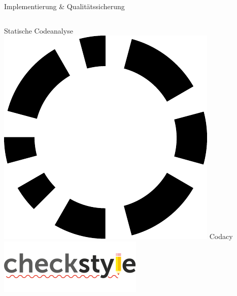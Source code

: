 \documentclass[xcolor=dvipsnames]{beamer}
\begin{document}
\begin{frame}{Implementierung \& Qualitätssicherung}
\begin{columns}
\begin{column}{0.5\textwidth}
\begin{block}{Statische Codeanalyse}
                    \includegraphics[width=(\textwidth / 4)]{img/codacy.pdf}
                    Codacy\\
                    \includegraphics[width=(\textwidth / 2)]{img/checkstyle.png}
                \end{block}
            \end{column}
        \end{columns}
    \end{frame}
\end{document}
